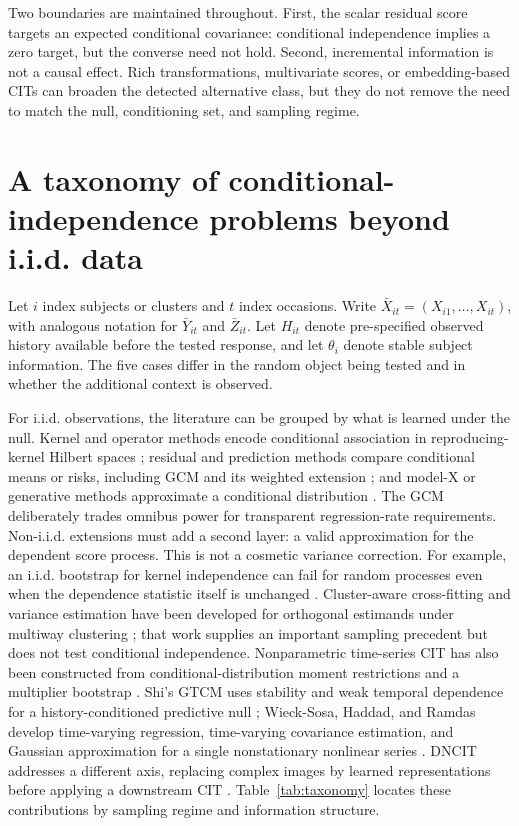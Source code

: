 \documentclass[11pt]{article}
\theoremstyle{definition}
\begin{document}
Two boundaries are maintained throughout. First, the scalar residual score targets an
expected conditional covariance: conditional independence implies a zero target, but the
converse need not hold. Second, incremental information is not a causal effect. Rich
transformations, multivariate scores, or embedding-based CITs can broaden the detected
alternative class, but they do not remove the need to match the null, conditioning set, and
sampling regime.

\section{A taxonomy of conditional-independence problems beyond i.i.d. data}

Let $i$ index subjects or clusters and $t$ index occasions. Write
$\bar X_{it}=(X_{i1},\ldots,X_{it})$, with analogous notation for $\bar Y_{it}$ and
$\bar Z_{it}$. Let $H_{it}$ denote pre-specified observed history available before the tested
response, and let
$\theta_i$ denote stable subject information. The five cases differ in the random object
being tested and in whether the additional context is observed.

For i.i.d. observations, the literature can be grouped by what is learned under the null.
Kernel and operator methods encode conditional association in reproducing-kernel Hilbert
spaces \cite{fukumizu2007,zhang2011}; residual and prediction methods compare conditional
means or risks, including GCM and its weighted extension \cite{shahpeters,scheidegger2022};
and model-X or generative methods approximate a conditional distribution
\cite{bellot2019}. The GCM deliberately trades omnibus power for transparent regression-rate
requirements. Non-i.i.d. extensions must add a second layer: a valid approximation for the
dependent score process. This is not a cosmetic variance correction. For example, an
i.i.d. bootstrap for kernel independence can fail for random processes even when the
dependence statistic itself is unchanged \cite{chwialkowski2014}.
Cluster-aware cross-fitting and variance estimation have been developed for orthogonal
estimands under multiway clustering \cite{chiang2022}; that work supplies an important
sampling precedent but does not test conditional independence. Nonparametric time-series CIT
has also been constructed from conditional-distribution moment restrictions and a multiplier
bootstrap \cite{songwei2021}.
Shi's GTCM uses stability and weak temporal dependence for a history-conditioned predictive
null \cite{shi2025}; Wieck-Sosa, Haddad, and Ramdas develop time-varying regression,
time-varying covariance estimation, and Gaussian approximation for a single nonstationary
nonlinear series \cite{wiecksosa2025}. DNCIT addresses a different axis, replacing complex
images by learned representations before applying a downstream CIT \cite{simnacher2024}.
Table~\ref{tab:taxonomy} locates these contributions by sampling regime and information structure.
\end{document}
